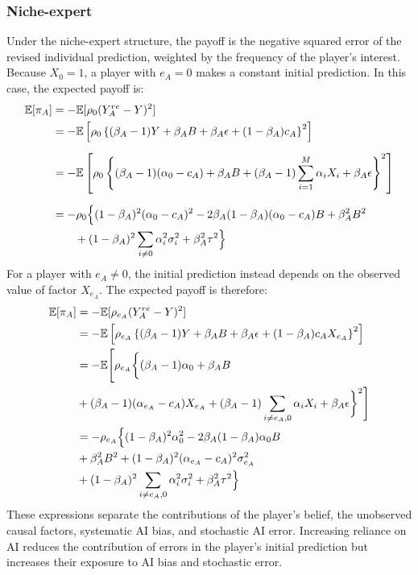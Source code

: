\documentclass[12pt]{article}
\begin{document}
\subsubsection*{Niche-expert}

Under the niche-expert structure, the payoff is the negative squared error of the revised individual prediction, weighted by the frequency of the player's interest. 
Because $X_0=1$, a player with $e_A=0$ makes a constant initial prediction. 
In this case, the expected payoff is:
\begin{align}
\mathbb{E}[\pi_A]
&= -\mathbb{E}[\rho_{0}(Y_A^{re} - Y)^2] \\
&= -\mathbb{E}\left[\rho_{0}\left\{(\beta_A - 1)Y + \beta_A B + \beta_A \epsilon + (1-\beta_A)c_A \right\}^2\right] \\[6pt]
&= -\mathbb{E}\left[\rho_{0}\left\{(\beta_A - 1)(\alpha_0- c_A) + \beta_A B + (\beta_A - 1)\sum_{i=1}^{M} \alpha_i X_i + \beta_A \epsilon\right\}^2\right] \\[6pt]
&= -\rho_{0}\Bigl\{(1-\beta_A)^2(\alpha_0 - c_A)^2 - 2\beta_A(1-\beta_A)(\alpha_0 - c_A) B + \beta_A^2 B^2\\
&\qquad + (1-\beta_A)^2\sum_{i \neq 0}\alpha_i^2\sigma_i^2  + \beta_A^2\tau^2\Bigr\}
\end{align}
For a player with $e_A\neq0$, the initial prediction instead depends on the observed value of factor $X_{e_A}$. The expected payoff is therefore:
\begin{align}
\mathbb{E}[\pi_A]
&= -\mathbb{E}[\rho_{e_A}(Y_A^{re} - Y)^2] \\
&= -\mathbb{E}\left[\rho_{e_A}\left\{(\beta_A - 1)Y + \beta_A B + \beta_A \epsilon + (1-\beta_A)c_A X_{e_A} \right\}^2\right] \\
&= -\mathbb{E}\Bigg[\rho_{e_A}\bigg\{(\beta_A -1 )\alpha_0 + \beta_A B \\
&+ (\beta_A - 1)(\alpha_{e_A} - c_A) X_{e_A} + (\beta_A - 1)\sum_{i \neq e_A, 0} \alpha_i X_i + \beta_A \epsilon\bigg\}^2\Bigg] \\
&= -\rho_{e_A}\Bigl\{ (1-\beta_A)^2\alpha_0^2 - 2\beta_A(1-\beta_A)\alpha_0 B\\
&+ \beta_A^2 B^2  + (1-\beta_A)^2(\alpha_{e_A} - c_A)^2\sigma_{e_A}^2 \\
&+ (1-\beta_A)^2\sum_{i \neq e_A, 0}\alpha_i^2\sigma_i^2 + \beta_A^2\tau^2\Bigr\}
\end{align}
These expressions separate the contributions of the player's belief, the unobserved causal factors, systematic AI bias, and stochastic AI error.
Increasing reliance on AI reduces the contribution of errors in the player's initial prediction but increases their exposure to AI bias and stochastic error.
\end{document}
